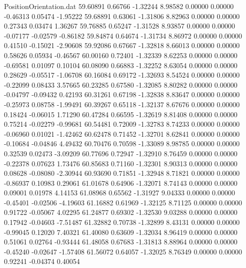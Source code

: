 \begin{filecontents}{PositionOrientation.dat}
  59.60891    0.66766   -1.32244     8.98582    0.00000    0.00000   -0.46313    0.05474   -1.95222
  59.68891    0.63061   -1.31806     8.82963    0.00000    0.00000    0.27343    0.03474    1.36267
  59.76885    0.65247   -1.31528     8.93857    0.00000    0.00000   -0.07177   -0.02579   -0.86182
  59.84874    0.64674   -1.31734     8.86972    0.00000    0.00000    0.41510   -0.15021   -2.90608
  59.92086    0.67667   -1.32818     8.66013    0.00000    0.00000    0.58626    0.05934   -0.46567
  60.00160    0.72401   -1.32339     8.62253    0.00000    0.00000   -0.69581    0.01097    0.10104
  60.08090    0.66883   -1.32252     8.63054    0.00000    0.00000    0.28629   -0.05517   -1.06708
  60.16084    0.69172   -1.32693     8.54524    0.00000    0.00000   -0.22099    0.08433    3.57665
  60.23285    0.67580   -1.32085     8.80282    0.00000    0.00000   -0.04797   -0.09432    0.42193
  60.31261    0.67198   -1.32838     8.83647    0.00000    0.00000   -0.25973    0.08758   -1.99491
  60.39267    0.65118   -1.32137     8.67676    0.00000    0.00000    0.18424   -0.06015    1.71290
  60.47284    0.66595   -1.32619     8.81408    0.00000    0.00000    0.75214   -0.02279   -0.99681
  60.54481    0.72009   -1.32783     8.74233    0.00000    0.00000   -0.06960    0.01021   -1.42462
  60.62478    0.71452   -1.32701     8.62841    0.00000    0.00000   -0.10684   -0.04846    4.49432
  60.70476    0.70598   -1.33089     8.98785    0.00000    0.00000    0.32539    0.02473   -3.09209
  60.77696    0.72947   -1.32910     8.76459    0.00000    0.00000   -0.22378    0.07623    1.73476
  60.85683    0.71160   -1.32301     8.90313    0.00000    0.00000    0.08628   -0.08080   -2.30944
  60.93690    0.71851   -1.32948     8.71821    0.00000    0.00000   -0.86937    0.10983    0.29061
  61.01678    0.64906   -1.32071     8.74143    0.00000    0.00000    0.09001    0.01978    4.14153
  61.08968    0.65562   -1.31927     9.04333    0.00000    0.00000   -0.45401   -0.02506   -4.19603
  61.16882    0.61969   -1.32125     8.71125    0.00000    0.00000    0.91722   -0.05067    4.02295
  61.24877    0.69302   -1.32530     9.03288    0.00000    0.00000    0.17942   -0.04603   -7.51487
  61.32882    0.70738   -1.32899     8.43131    0.00000    0.00000   -0.99045    0.12020    7.40321
  61.40080    0.63609   -1.32034     8.96419    0.00000    0.00000    0.51061    0.02764   -0.93444
  61.48058    0.67683   -1.31813     8.88964    0.00000    0.00000   -0.45240   -0.02647   -1.57408
  61.56072    0.64057   -1.32025     8.76349    0.00000    0.00000    0.92241   -0.04374    0.40054

\end{filecontents}
